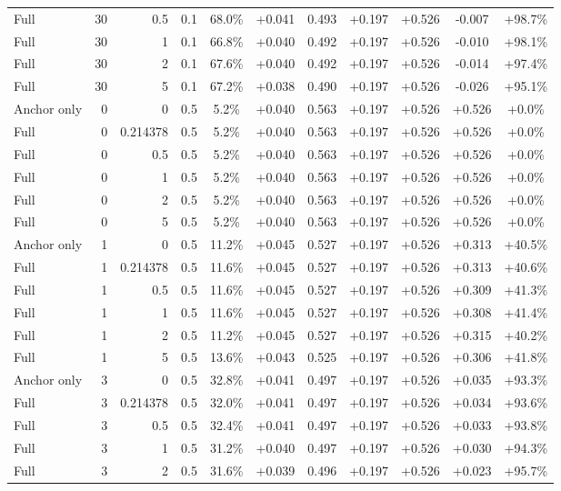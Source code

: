 \begin{table}[htbp]
\begin{tabular}{lrrrccccccc}
Full & 30 & 0.5 & 0.1 & 68.0\% & +0.041 & 0.493 & +0.197 & +0.526 & -0.007 & +98.7\% \\
Full & 30 & 1 & 0.1 & 66.8\% & +0.040 & 0.492 & +0.197 & +0.526 & -0.010 & +98.1\% \\
Full & 30 & 2 & 0.1 & 67.6\% & +0.040 & 0.492 & +0.197 & +0.526 & -0.014 & +97.4\% \\
Full & 30 & 5 & 0.1 & 67.2\% & +0.038 & 0.490 & +0.197 & +0.526 & -0.026 & +95.1\% \\
Anchor only & 0 & 0 & 0.5 & 5.2\% & +0.040 & 0.563 & +0.197 & +0.526 & +0.526 & +0.0\% \\
Full & 0 & 0.214378 & 0.5 & 5.2\% & +0.040 & 0.563 & +0.197 & +0.526 & +0.526 & +0.0\% \\
Full & 0 & 0.5 & 0.5 & 5.2\% & +0.040 & 0.563 & +0.197 & +0.526 & +0.526 & +0.0\% \\
Full & 0 & 1 & 0.5 & 5.2\% & +0.040 & 0.563 & +0.197 & +0.526 & +0.526 & +0.0\% \\
Full & 0 & 2 & 0.5 & 5.2\% & +0.040 & 0.563 & +0.197 & +0.526 & +0.526 & +0.0\% \\
Full & 0 & 5 & 0.5 & 5.2\% & +0.040 & 0.563 & +0.197 & +0.526 & +0.526 & +0.0\% \\
Anchor only & 1 & 0 & 0.5 & 11.2\% & +0.045 & 0.527 & +0.197 & +0.526 & +0.313 & +40.5\% \\
Full & 1 & 0.214378 & 0.5 & 11.6\% & +0.045 & 0.527 & +0.197 & +0.526 & +0.313 & +40.6\% \\
Full & 1 & 0.5 & 0.5 & 11.6\% & +0.045 & 0.527 & +0.197 & +0.526 & +0.309 & +41.3\% \\
Full & 1 & 1 & 0.5 & 11.6\% & +0.045 & 0.527 & +0.197 & +0.526 & +0.308 & +41.4\% \\
Full & 1 & 2 & 0.5 & 11.2\% & +0.045 & 0.527 & +0.197 & +0.526 & +0.315 & +40.2\% \\
Full & 1 & 5 & 0.5 & 13.6\% & +0.043 & 0.525 & +0.197 & +0.526 & +0.306 & +41.8\% \\
Anchor only & 3 & 0 & 0.5 & 32.8\% & +0.041 & 0.497 & +0.197 & +0.526 & +0.035 & +93.3\% \\
Full & 3 & 0.214378 & 0.5 & 32.0\% & +0.041 & 0.497 & +0.197 & +0.526 & +0.034 & +93.6\% \\
Full & 3 & 0.5 & 0.5 & 32.4\% & +0.041 & 0.497 & +0.197 & +0.526 & +0.033 & +93.8\% \\
Full & 3 & 1 & 0.5 & 31.2\% & +0.040 & 0.497 & +0.197 & +0.526 & +0.030 & +94.3\% \\
Full & 3 & 2 & 0.5 & 31.6\% & +0.039 & 0.496 & +0.197 & +0.526 & +0.023 & +95.7\% \\

\end{tabular}
\end{table}
